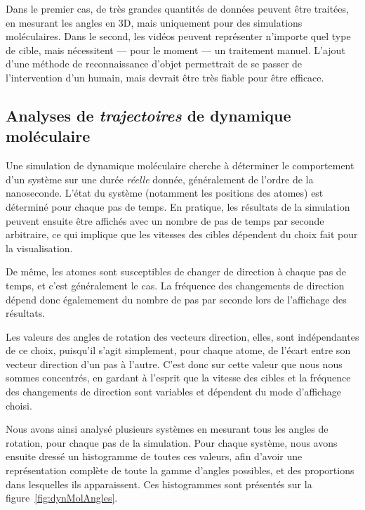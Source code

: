 	Dans le premier cas, de très grandes quantités de données peuvent être traitées, en mesurant les angles en 3D, mais uniquement pour des simulations moléculaires. Dans le second, les vidéos peuvent représenter n'importe quel type de cible, mais nécessitent --- pour le moment --- un traitement manuel. L'ajout d'une méthode de reconnaissance d'objet permettrait de se passer de l'intervention d'un humain, mais devrait être très fiable pour être efficace.
	
	\subsection{Analyses de \emph{trajectoires} de dynamique moléculaire}
	Une simulation de dynamique moléculaire cherche à déterminer le comportement d'un système sur une durée \emph{réelle} donnée, généralement de l'ordre de la nanoseconde. L'état du système (notamment les positions des atomes) est déterminé pour chaque pas de temps. En pratique, les résultats de la simulation peuvent ensuite être affichés avec un nombre de pas de temps par seconde arbitraire, ce qui implique que les vitesses des cibles dépendent du choix fait pour la visualisation.
	
	De même, les atomes sont susceptibles de changer de direction à chaque pas de temps, et c'est généralement le cas. La fréquence des changements de direction dépend donc égalemement du nombre de pas par seconde lors de l'affichage des résultats.
	
	Les valeurs des angles de rotation des vecteurs direction, elles, sont indépendantes de ce choix, puisqu'il s'agit simplement, pour chaque atome, de l'écart entre son vecteur direction d'un pas à l'autre. C'est donc sur cette valeur que nous nous sommes concentrés, en gardant à l'esprit que la vitesse des cibles et la fréquence des changements de direction sont variables et dépendent du mode d'affichage choisi.
	
	Nous avons ainsi analysé plusieurs systèmes en mesurant tous les angles de rotation, pour chaque pas de la simulation. Pour chaque système, nous avons ensuite dressé un histogramme de toutes ces valeurs, afin d'avoir une représentation complète de toute la gamme d'angles possibles, et des proportions dans lesquelles ils apparaissent. Ces histogrammes sont présentés sur la figure~\ref{fig:dynMolAngles}.
	
